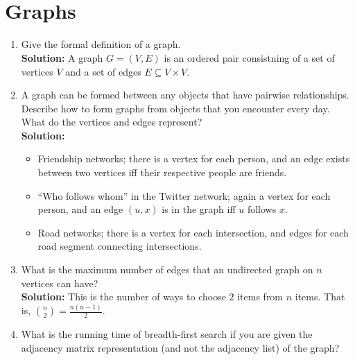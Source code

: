 \documentclass[letterpaper,11pt]{article}
\begin{document}
\thispagestyle{plain}


 \\

 \\

\section{Graphs}
\begin{enumerate}
\item Give the formal definition of a graph.\\

\textbf{Solution:} A graph $G=(V,E)$ is an ordered pair consistning of a set of vertices $V$ and a set of edges $E\subseteq V\times V$.

\item A graph can be formed between any objects that have pairwise relationships. Describe how to form graphs from objects that you encounter every day. What do the vertices and edges represent?\\

\textbf{Solution:} 
\begin{itemize}
\item Friendship networks; there is a vertex for each person, and an edge exists between two vertices iff their respective people are friends.
\item ``Who follows whom'' in the Twitter network; again a vertex for each person, and an edge $(u,x)$ is in the graph iff $u$ follows $x$.
\item Road networks; there is a vertex for each intersection, and edges for each road segment connecting intersections.
\end{itemize}

\item What is the maximum number of edges that an undirected graph on $n$ vertices can have?\\

\textbf{Solution:} This is the number of ways to choose $2$ items from $n$ items. That is, $\binom{n}{2} = \frac{n(n-1)}{2}$.

\item What is the running time of breadth-first search if you are given the adjacency matrix representation (and not the adjacency list) of the graph?\\


\end{enumerate}
\end{document}
